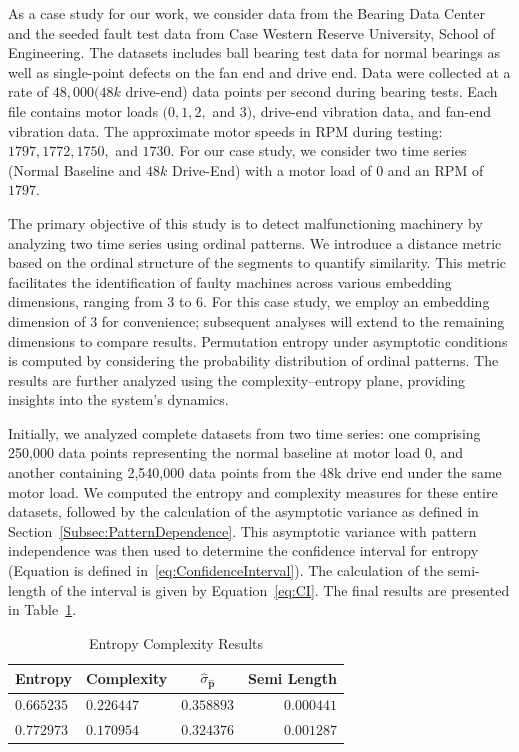 As a case study for our work, we consider data from the Bearing Data Center and the seeded fault test data from Case Western Reserve University, School of Engineering. The datasets includes ball bearing test data for normal bearings as well as single-point defects on the fan end and drive end. Data were collected at a rate of $48,000 (48k$ drive-end) data points per second during bearing tests. Each file contains motor loads $(0, 1, 2,$ and $3)$, drive-end vibration data, and fan-end vibration data. The approximate motor speeds in RPM during testing: $1797, 1772, 1750,$ and $1730$. For our case study, we consider two time series (Normal Baseline and $48k$ Drive-End) with a motor load of $0$ and an RPM of $1797$. 

The primary objective of this study is to detect malfunctioning machinery by analyzing two time series using ordinal patterns. We introduce a distance metric based on the ordinal structure of the segments to quantify similarity. This metric facilitates the identification of faulty machines across various embedding dimensions, ranging from $3$ to $6$. For this case study, we employ an embedding dimension of $3$ for convenience; subsequent analyses will extend to the remaining dimensions to compare results. Permutation entropy under asymptotic conditions is computed by considering the probability distribution of ordinal patterns. The results are further analyzed using the complexity–entropy plane, providing insights into the system's dynamics.

Initially, we analyzed complete datasets from two time series: one comprising 250,000 data points representing the normal baseline at motor load 0, and another containing 2,540,000 data points from the 48k drive end under the same motor load. We computed the entropy and complexity measures for these entire datasets, followed by the calculation of the asymptotic variance as defined in Section~\ref{Subsec:PatternDependence}. This asymptotic variance with pattern independence was then used to determine the confidence interval for entropy (Equation is defined in~\ref{eq:ConfidenceInterval}). The calculation of the semi-length of the interval is given by Equation~\ref{eq:CI}. 
The final results are presented in Table~\ref{tab:EnComplexResults}.

\begin{table}[H]
	\centering
	\begin{tabular}{llcr}
		\toprule
		Entropy  & Complexity  & $\widehat{\sigma}_{\widehat{\mathbf{p}}}$ & Semi Length \\
		\midrule
		$0.665235$ & $0.226447$ & $0.358893$ & $0.000441$\\ 
		$0.772973$ & $0.170954$ & $0.324376$ & $0.001287$\\
		\bottomrule
	\end{tabular}
	\caption{Entropy Complexity Results}
	\label{tab:EnComplexResults}
\end{table}

